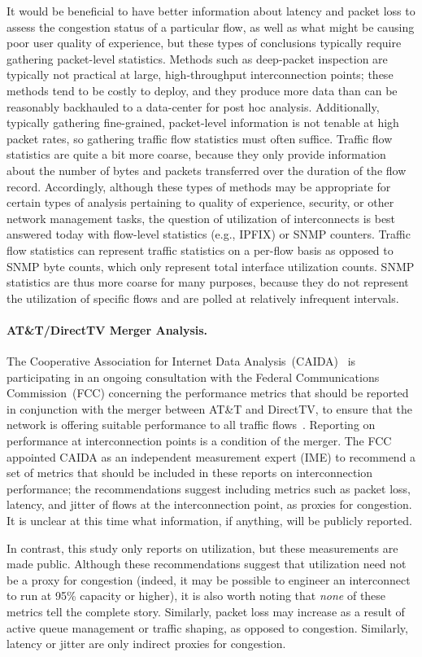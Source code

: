 It would be beneficial to have better information about latency and
packet loss to assess the congestion status of a particular flow, as
well as what might be causing poor user quality of experience, but these
types of conclusions typically require gathering packet-level
statistics.  Methods such as deep-packet inspection are typically not
practical at large, high-throughput interconnection points; these
methods tend to be costly to deploy, and they produce more data than can
be reasonably backhauled to a data-center for post hoc analysis.
Additionally, typically gathering fine-grained, packet-level information
is not tenable at high packet rates, so gathering traffic flow
statistics must often suffice.  Traffic flow statistics are quite a bit
more coarse, because they only provide information about the number of
bytes and packets transferred over the duration of the
flow record.  Accordingly, although these types of methods may be
appropriate for certain types of analysis pertaining to quality of
experience, security, or other network management tasks, the question of
utilization of interconnects is best answered today with flow-level
statistics (e.g., IPFIX) or SNMP counters.  Traffic flow statistics can
represent traffic statistics on a per-flow basis as opposed to SNMP byte
counts, which only represent total interface utilization counts. SNMP
statistics are thus more coarse for many purposes, because they do not represent the
utilization of specific flows and are polled at relatively infrequent
intervals.

\paragraph{AT\&T/DirectTV Merger Analysis.} The Cooperative Association
for Internet Data Analysis~(CAIDA)~\cite{www-caida} is participating in an ongoing
consultation with the Federal Communications Commission~(FCC) concerning the
performance metrics that should be reported in conjunction with the
merger between AT\&T and DirectTV, to ensure that the network is
offering suitable performance to all traffic flows~\cite{fcc-att}.  Reporting on
performance at interconnection points is a condition of the
merger. The FCC appointed CAIDA as an independent measurement expert
(IME) to recommend a set of metrics that should be included in these
reports on interconnection performance; the recommendations suggest
including metrics such as packet loss, latency, and jitter of flows at
the interconnection point, as proxies for congestion. It is unclear at
this time what information, if anything, will be publicly reported. 

In contrast, this study only
reports on utilization, but these measurements are made public. Although
these recommendations suggest that 
utilization need not be a proxy for congestion (indeed, it may be
possible to engineer an interconnect to run at 95\% capacity or higher),
it is also worth noting that {\em none} of these metrics tell the
complete story. Similarly, packet loss may increase as a result of
active queue management or traffic shaping, as opposed to
congestion. Similarly, latency or jitter are only indirect proxies for
congestion.
